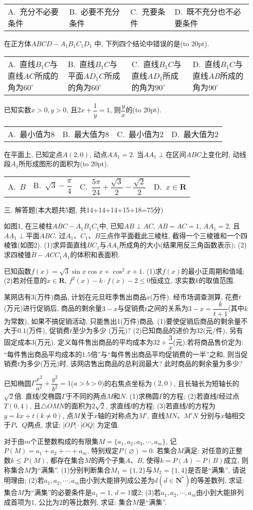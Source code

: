 \documentclass[10pt,a4paper]{article}
\newcommand{\bracket}[1]{(\hbox to #1pt{})}
\newcommand{\fourch}[4]{\par\begin{tabular}{p{.23\textwidth}p{.23\textwidth}p{.23\textwidth}p{.23\textwidth}}
A.~#1 &B.~#2& C.~#3& D.~#4
\end{tabular}}
\begin{document}
\fourch{充分不必要条件}{必要不充分条件}{充要条件}{既不充分也不必要条件}
\item 在正方体$ABCD-A_1B_1C_1D_1$ 中, 下列四个结论中错误的是\bracket{20}.
\fourch{直线$B_1C$与直线$AC$所成的角为$60^\circ$}{直线$B_1C$与平面$AD_1C$所成的角为$60^\circ$}{直线$B_1C$与直线$AD_1$所成的角为$90^\circ$}{直线$B_1C$与直线$AB$所成的角为$90^\circ$}
\item 已知实数$x>0,y>0$, 且$2x+\dfrac 1y=1$, 则$\dfrac yx$的\bracket{20}.
\fourch{最小值为8}{最大值为8}{最小值为2}{最大值为2}
\item 在平面上, 已知定点$A(2,0)$, 动点$AA_1=2$. 当$AA_1\perp$在区间$ABC$上变化时, 动线段$A_1$所形成图形的面积为\bracket{20}.
\fourch{$B$}{$\sqrt 3-\dfrac{\pi }4$}{$\dfrac{5\pi }{24}+\dfrac{\sqrt 3}2-\dfrac{\sqrt 2}2$}{$x\in \mathbf{R}$}
三. 解答题(本大题共5题, 共14+14+14+15+18=75分)
\item 如图1, 在三棱柱$ABC-A_1B_1C_1$中, 已知$AB\perp AC$, $AB=AC=1$, $AA_1=2$, 且$AA_1\perp$平面$ABC$. 过$A_1$、$C_1$、$B$三点作平面截此三棱柱, 截得一个三棱锥和一个四棱锥(如图2).
(1)求异面直线$BC_1$与$AA_1$所成角的大小(结果用反三角函数表示);
(2)求四棱锥$B-ACC_1A_1$的体积和表面积.
\item 已知函数$f(x)=\sqrt 3\sin x\cos x+\cos ^2x+1$.
(1)求$f(x)$的最小正周期和值域;
(2)若对任意的$x\in \mathbf{R}$, $f^2(x)-k\cdot f(x)-2\le 0$恒成立, 求实数$k$的取值范围.
\item 某网店有3(万件)商品, 计划在元旦旺季售出商品$x$(万件). 经市场调查测算, 花费$t$(万元)进行促销后, 商品的剩余量$3-x$与促销费$t$之间的关系为$3-x=\dfrac k{t+1}$(其中$k$为常数), 如果不搞促销活动, 只能售出1(万件)商品.
(1)要使促销后商品的剩余量不大于$0.1$(万件), 促销费$t$至少为多少 (万元)?
(2)已知商品的进价为32(元/件), 另有固定成本3(万元). 定义每件售出商品的平均成本为$32+\dfrac 3x$(元).若将商品售价定为: ``每件售出商品平均成本的$1.5$倍''与``每件售出商品平均促销费的一半''之和, 则当促销费$t$为多少(万元)时, 该网店售出商品的总利润最大? 此时商品的剩余量为多少?
\item 已知椭圆$\Gamma \dfrac{x^2}{a^2}+\dfrac{y^2}{b^2}=1$($a>b>0$)的右焦点坐标为$(2,0)$, 且长轴长为短轴长的$\sqrt 2$倍. 直线$l$交椭圆$\Gamma$于不同的两点$M$和$N$.
(1)求椭圆$\Gamma$的方程;
(2)若直线$l$经过点$T(0,4)$, 且$\triangle OMN$的面积为$2\sqrt 2$, 求直线$l$的方程;
(3)若直线$l$的方程为$y=kx+t(k\ne 0)$, 点$M$关于$x$轴的对称点为$M'$, 直线$MN$、$M'N$ 分别与$x$轴相交于$P$、$Q$两点, 求证: $|OP|\cdot|OQ|$ 为定值.
\item 对于由$m$个正整数构成的有限集$M=\{a_1,a_2,a_3,\cdots ,a_m\}$, 记$P(M)=a_1+a_2+\cdots +a_m$, 特别规定$P(\varnothing)=0$. 若集合$M$满足: 对任意的正整数$k\le P(M)$, 都存在集合$M$的两个子集$A$、$B$, 使得$k=P(A)-P(B)$成立, 则称集合$M$为``满集''.
(1)分别判断集合$M_1=\{1,2\}$与$M_2=\{1,4\}$是否是``满集'', 请说明理由;
(2)若$a_1,a_2,\cdots ,a_m$由小到大能排列成公差为$d(d\in \mathbf{N}^*)$的等差数列, 求证: 集合$M$为``满集''的必要条件是$a_1=1$, $d=1$或$2$;
(3)若$a_1,a_2,\cdots ,a_m$由小到大能排列成首项为$1$, 公比为$2$的等比数列, 求证: 集合$M$是``满集''.
\end{document}
